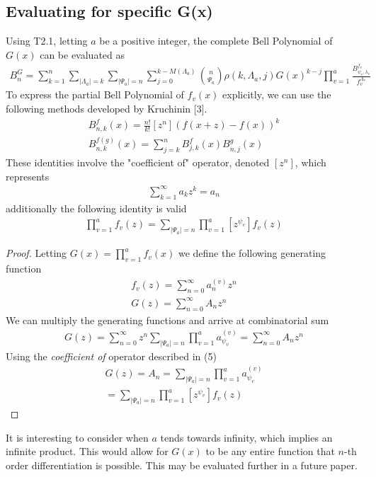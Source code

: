 \documentclass[11pt]{article}
\theoremstyle{plain}
\theoremstyle{definition}
\begin{document}
\subsection{Evaluating for specific G(x)}
Using T2.1, letting $a$ be a positive integer, the complete Bell Polynomial of $G(x)$ can be evaluated as
\begin{align*}
    B_n^G = \sum_{k=1}^n \sum_{|\Lambda_a|=k} \sum_{|\Psi_a|=n}\sum_{j=0}^{k-M(\Lambda_a)} \binom{n}{\Psi_a} \rho(k,\Lambda_a,j) G(x)^{k-j} \prod_{v=1}^{a} \frac{B_{\psi_v,\lambda_v}^{f_v}}{f_v^{\Lambda_v}}
\end{align*}
To express the partial Bell Polynomial of $f_v(x)$ explicitly, we can use the following methods developed by Kruchinin [3].
\begin{align*}
B_{n,k}^f(x) = \frac{n!}{k!}[z^n](f(x+z)-f(x))^k \tag{3}\\
B_{n,k}^{f(g)}(x) = \sum_{j=k}^n B_{j,k}^f(x) B_{n,j}^g(x)\tag{4}
\end{align*}
These identities involve the "coefficient of" operator, denoted $[z^n]$, which represents
\begin{align*}
    [z^n]\sum_{k=1}^\infty a_k z^k = a_n
\end{align*}
additionally the following identity is valid
\begin{align*}
[z^n] \prod_{v=1}^a f_v(z) = \sum_{|\Psi_a|=n} \prod_{v=1}^a [z^{\psi_v}]f_v(z) \tag{5}
\end{align*}

\begin{proof}
    Letting $G(x) = \prod_{v=1}^af_v(x)$ we define the following generating function
    \begin{align*}
        f_v(z) = \sum_{n=0}^\infty a_n^{(v)} z^n \\
        G(z) = \sum_{n=0}^\infty A_n z^n
    \end{align*}
    We can multiply the generating functions and arrive at combinatorial sum
    \begin{align*}
        G(z) = \sum_{n=0}^\infty z^n \sum_{|\Psi_a|=n}\prod_{v=1}^a a_{\psi_v}^{(v)} = \sum_{n=0}^\infty A_n z^n
    \end{align*}
    Using the \textit{coefficient of} operator described in (5)
    \begin{align*}
        [z^n]G(z) = A_n = \sum_{|\Psi_a|=n}\prod_{v=1}^a a_{\psi_v}^{(v)}\\
        =\sum_{|\Psi_a|=n} \prod_{v=1}^a [z^{\psi_v}] f_v(z)
    \end{align*}
\end{proof}
It is interesting to consider when $a$ tends towards infinity, which implies an infinite product. This would allow for $G(x)$ to be any entire function that $n$-th order differentiation is possible. This may be evaluated further in a future paper.
\end{document}
